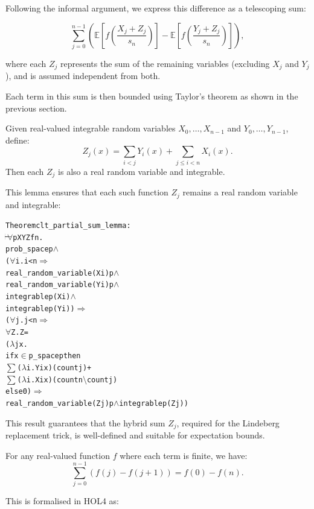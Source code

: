 Following the informal argument, we express this difference as a telescoping sum:

\[
\sum_{j=0}^{n-1} \left(
\mathbb{E}\left[f\left(\frac{X_j + Z_j}{s_n}\right)\right]
-
\mathbb{E}\left[f\left(\frac{Y_j + Z_j}{s_n}\right)\right]
\right),
\]

where each $Z_j$ represents the sum of the remaining variables (excluding $X_j$ and $Y_j$), and is assumed independent from both.

Each term in this sum is then bounded using Taylor's theorem as shown in the previous section.

\begin{lemma}
  Given real-valued integrable random variables $ X_0, \dots, X_{n-1} $ and $ Y_0, \dots, Y_{n-1} $, define:
  \[
  Z_j(x) = \sum_{i<j} Y_i(x) + \sum_{j \le i < n} X_i(x).
  \]
  Then each $ Z_j $ is also a real random variable and integrable.
\end{lemma}


This lemma ensures that each such function $Z_j$ remains a real random variable and integrable:

\begin{hol}
\begin{alltt}
Theorem clt\_partial\_sum\_lemma :
\(\!\!\!{\turn}\!\!\!\!\) \(\forall\)p X Y Z f n.
prob\_space p \(\land\)
(\(\forall\)i. i < n \(\Rightarrow\)
  real\_random\_variable (X i) p \(\land\)
  real\_random\_variable (Y i) p \(\land\)
  integrable p (X i) \(\land\)
  integrable p (Y i)) \(\Rightarrow\)
(\(\forall\)j. j < n \(\Rightarrow\)
  \(\forall\)Z. Z =
    (\(\lambda\)j x.
      if x \(\in\) p\_space p then
        \(\sum\) (\(\lambda\)i. Y i x) (count j) +
        \(\sum\) (\(\lambda\)i. X i x) (count n \(\setminus\) count j)
      else 0) \(\Rightarrow\)
    real\_random\_variable (Z j) p \(\land\) integrable p (Z j))
\end{alltt}
\end{hol}

This result guarantees that the hybrid sum $Z_j$, required for the Lindeberg replacement trick, is well-defined and suitable for expectation bounds.

\begin{lemma}
  For any real-valued function \( f \) where each term is finite, we have:
  \[
  \sum_{j = 0}^{n-1} (f(j) - f(j+1)) = f(0) - f(n).
  \]
\end{lemma}

This is formalised in HOL4 as:

